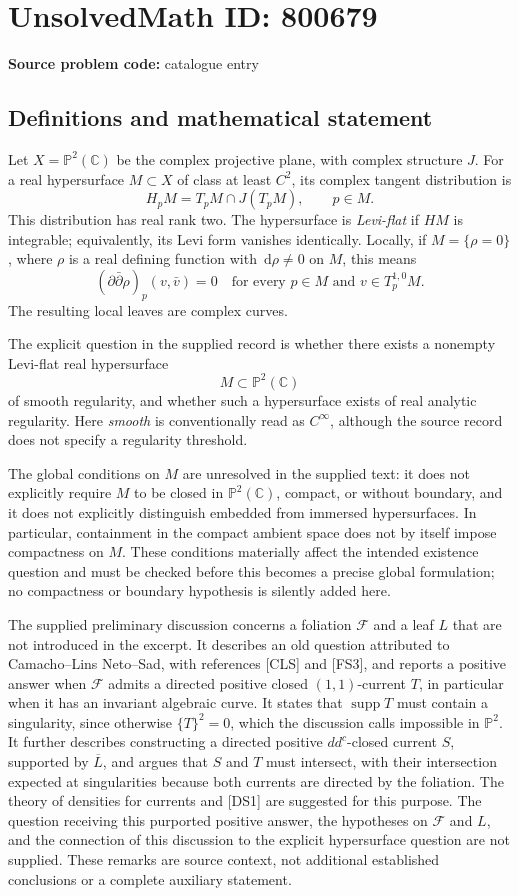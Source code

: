 \documentclass[11pt]{article}
\newcommand{\C}{\mathbb{C}}
\newcommand{\PP}{\mathbb{P}}
\newcommand{\dd}{\,\mathrm{d}}
\begin{document}
\section*{UnsolvedMath ID: 800679}
\textbf{Source problem code:} catalogue entry
\subsection{Definitions and mathematical statement}
Let \(X=\PP^2(\C)\) be the complex projective plane, with complex structure \(J\). For a real hypersurface \(M\subset X\) of class at least \(C^2\), its complex tangent distribution is
\[
H_pM=T_pM\cap J(T_pM),\qquad p\in M.
\]
This distribution has real rank two. The hypersurface is \emph{Levi-flat} if \(HM\) is integrable; equivalently, its Levi form vanishes identically. Locally, if \(M=\{\rho=0\}\), where \(\rho\) is a real defining function with \(\dd\rho\ne0\) on \(M\), this means
\[
(\partial\bar\partial\rho)_p(v,\bar v)=0
\quad\text{for every }p\in M\text{ and }v\in T_p^{1,0}M.
\]
The resulting local leaves are complex curves.

The explicit question in the supplied record is whether there exists a nonempty Levi-flat real hypersurface
\[
M\subset\PP^2(\C)
\]
of smooth regularity, and whether such a hypersurface exists of real analytic regularity. Here \emph{smooth} is conventionally read as \(C^\infty\), although the source record does not specify a regularity threshold.

The global conditions on \(M\) are unresolved in the supplied text: it does not explicitly require \(M\) to be closed in \(\PP^2(\C)\), compact, or without boundary, and it does not explicitly distinguish embedded from immersed hypersurfaces. In particular, containment in the compact ambient space does not by itself impose compactness on \(M\). These conditions materially affect the intended existence question and must be checked before this becomes a precise global formulation; no compactness or boundary hypothesis is silently added here.

The supplied preliminary discussion concerns a foliation \(\mathscr F\) and a leaf \(L\) that are not introduced in the excerpt. It describes an old question attributed to Camacho--Lins Neto--Sad, with references [CLS] and [FS3], and reports a positive answer when \(\mathscr F\) admits a directed positive closed \((1,1)\)-current \(T\), in particular when it has an invariant algebraic curve. It states that \(\operatorname{supp}T\) must contain a singularity, since otherwise \(\{T\}^2=0\), which the discussion calls impossible in \(\PP^2\). It further describes constructing a directed positive \(dd^c\)-closed current \(S\), supported by \(\overline L\), and argues that \(S\) and \(T\) must intersect, with their intersection expected at singularities because both currents are directed by the foliation. The theory of densities for currents and [DS1] are suggested for this purpose. The question receiving this purported positive answer, the hypotheses on \(\mathscr F\) and \(L\), and the connection of this discussion to the explicit hypersurface question are not supplied. These remarks are source context, not additional established conclusions or a complete auxiliary statement.
\end{document}
